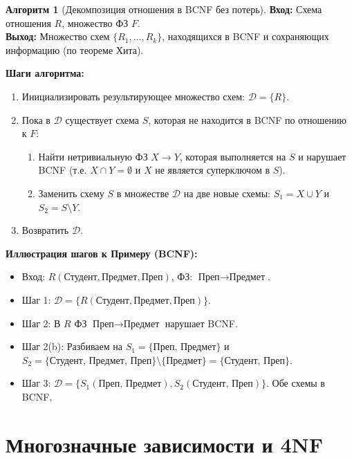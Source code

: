 \documentclass[12pt,a4paper]{article}
\theoremstyle{definition}
\newtheorem{algorithm}{Алгоритм}
\theoremstyle{plain}
\begin{document}
\vspace{1em}
\begin{algorithm}[Декомпозиция отношения в BCNF без потерь]
\textbf{Вход:} Схема отношения $R$, множество ФЗ $F$. \\
\textbf{Выход:} Множество схем $\{R_1, \dots, R_k\}$, находящихся в BCNF и сохраняющих информацию (по теореме Хита).

\textbf{Шаги алгоритма:}
\begin{enumerate}
    \item Инициализировать результирующее множество схем: $\mathcal{D} = \{R\}$.
    \item Пока в $\mathcal{D}$ существует схема $S$, которая не находится в BCNF по отношению к $F$:
    \begin{enumerate}
        \item Найти нетривиальную ФЗ $X \to Y$, которая выполняется на $S$ и нарушает BCNF (т.е. $X \cap Y = \emptyset$ и $X$ не является суперключом в $S$).
        \item Заменить схему $S$ в множестве $\mathcal{D}$ на две новые схемы: $S_1 = X \cup Y$ и $S_2 = S \setminus Y$.
    \end{enumerate}
    \item Возвратить $\mathcal{D}$.
\end{enumerate}
\end{algorithm}

\textbf{Иллюстрация шагов к Примеру (BCNF):}
\begin{itemize}
    \item Вход: $R(\text{Студент}, \text{Предмет}, \text{Преп})$, ФЗ: $\text{Преп} \to \text{Предмет}$.
    \item Шаг 1: $\mathcal{D} = \{R(\text{Студент}, \text{Предмет}, \text{Преп})\}$.
    \item Шаг 2: В $R$ ФЗ $\text{Преп} \to \text{Предмет}$ нарушает BCNF.
    \item Шаг 2(b): Разбиваем на $S_1 = \{\text{Преп, Предмет}\}$ и $S_2 = \{\text{Студент, Предмет, Преп}\} \setminus \{\text{Предмет}\} = \{\text{Студент, Преп}\}$.
    \item Шаг 3: $\mathcal{D} = \{S_1(\text{Преп, Предмет}), S_2(\text{Студент, Преп})\}$. Обе схемы в BCNF.
\end{itemize}

\section{Многозначные зависимости и 4NF}
\end{document}
